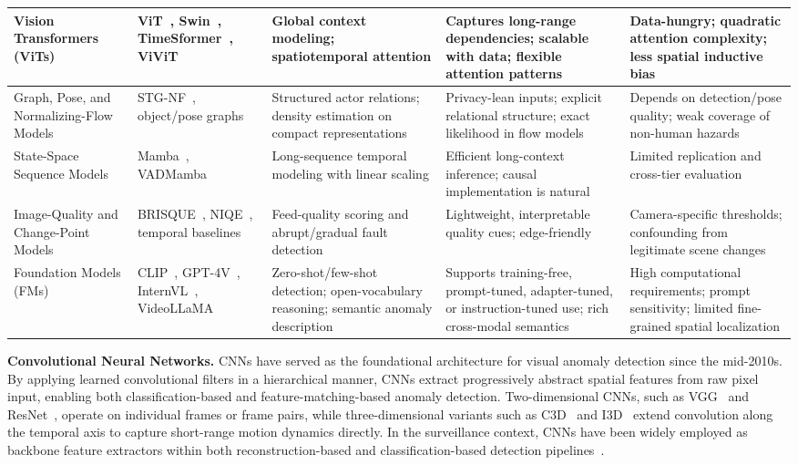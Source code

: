 \documentclass[10pt,a4paper]{article}
\begin{document}
\begin{table}[!t]
{\begin{tabular}{p{3.2cm}p{3.5cm}p{3.5cm}p{3.5cm}p{3.5cm}}
\midrule
Vision Transformers (ViTs) & ViT~\citep{dosovitskiy2020image}, Swin~\citep{liu2021swin}, TimeSformer~\citep{bertasius2021space}, ViViT~\citep{arnab2021vivit} & Global context modeling; spatiotemporal attention & Captures long-range dependencies; scalable with data; flexible attention patterns & Data-hungry; quadratic attention complexity; less spatial inductive bias \\
\midrule
Graph, Pose, and Normalizing-Flow Models & STG-NF~\citep{hirschorn2023normalizing}, object/pose graphs & Structured actor relations; density estimation on compact representations & Privacy-lean inputs; explicit relational structure; exact likelihood in flow models & Depends on detection/pose quality; weak coverage of non-human hazards \\
\midrule
State-Space Sequence Models & Mamba~\citep{gu2023mamba}, VADMamba~\citep{lyu2025vadmamba} & Long-sequence temporal modeling with linear scaling & Efficient long-context inference; causal implementation is natural & Limited replication and cross-tier evaluation \\
\midrule
Image-Quality and Change-Point Models & BRISQUE~\citep{mittal2012brisque}, NIQE~\citep{mittal2013niqe}, temporal baselines & Feed-quality scoring and abrupt/gradual fault detection & Lightweight, interpretable quality cues; edge-friendly & Camera-specific thresholds; confounding from legitimate scene changes \\
\midrule
Foundation Models (FMs) & CLIP~\citep{radford2021learning}, GPT-4V~\citep{achiam2023gpt}, InternVL~\citep{chen2024internvl}, VideoLLaMA~\citep{zhang2023video} & Zero-shot/few-shot detection; open-vocabulary reasoning; semantic anomaly description & Supports training-free, prompt-tuned, adapter-tuned, or instruction-tuned use; rich cross-modal semantics & High computational requirements; prompt sensitivity; limited fine-grained spatial localization \\
\bottomrule
\end{tabular}%
}
\end{table}


\textbf{Convolutional Neural Networks.} CNNs have served as the foundational architecture for visual anomaly detection since the mid-2010s. By applying learned convolutional filters in a hierarchical manner, CNNs extract progressively abstract spatial features from raw pixel input, enabling both classification-based and feature-matching-based anomaly detection. Two-dimensional CNNs, such as VGG~\citep{simonyan2014very} and ResNet~\citep{he2016deep}, operate on individual frames or frame pairs, while three-dimensional variants such as C3D~\citep{tran2015learning} and I3D~\citep{carreira2017quo} extend convolution along the temporal axis to capture short-range motion dynamics directly. In the surveillance context, CNNs have been widely employed as backbone feature extractors within both reconstruction-based and classification-based detection pipelines~\citep{sultani2018real, liu2018future}.
\end{document}
